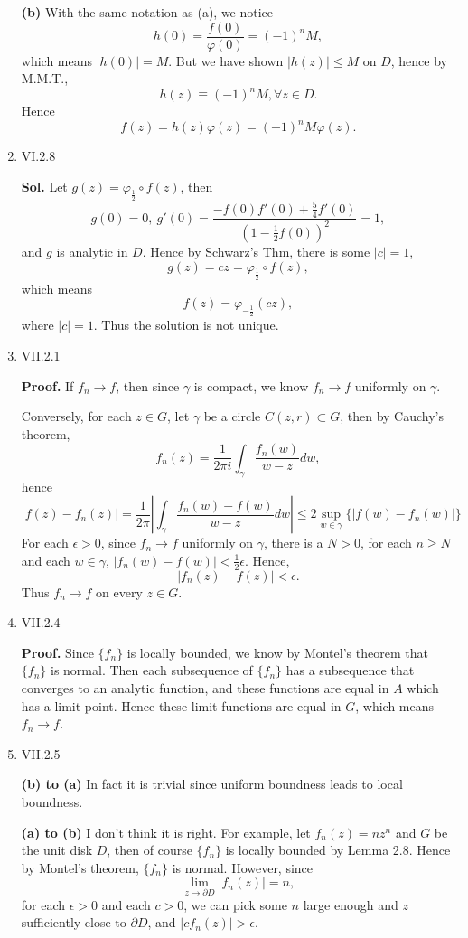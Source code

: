 \documentclass{article}%
\begin{document}
\begin{enumerate}
\textbf{(b)}
With the same notation as (a), we notice
$$
h(0) = \frac{f(0)}{\varphi(0)} = (-1)^{n}M,
$$
which means $|h(0)| = M$. But we have shown $|h(z)| \le M$ on $D$, hence by M.M.T., 
$$
h(z) \equiv (-1)^nM, \forall z\in D.
$$
Hence
$$
f(z) = h(z)\varphi(z) = (-1)^nM\varphi(z).
$$

\item VI.2.8

\textbf{Sol.}
Let $g(z) = \varphi_{\frac{1}{2}}\circ f(z) $, then 
$$
g(0) = 0, ~g'(0) = \frac{-f(0)f'(0)+\frac{5}{4}f'(0)}{(1-\frac{1}{2}f(0))^2} = 1,
$$
and $g$ is analytic in $D$. Hence by Schwarz's Thm, there is some $|c| = 1$,
$$
g(z) = cz = \varphi_{\frac{1}{2}}\circ f(z),
$$ 
which means
$$
f(z) = \varphi_{-\frac{1}{2}}(cz),
$$
where $|c| = 1$. Thus the solution is not unique.


\item VII.2.1

\textbf{Proof.} 
If $f_n\to f $, then since $\gamma$ is compact, we know $f_n\to f $ uniformly on $\gamma$.

Conversely, for each $z\in G$, let $\gamma$ be a circle $C(z, r)\subset G$, then by Cauchy's theorem,
$$
f_n(z) = \frac{1}{2\pi i}\int_{\gamma}\frac{f_n(w)}{w-z}dw,
$$
hence
$$
|f(z)-f_n(z)| = \frac{1}{2\pi}\left|\int_{\gamma}\frac{f_n(w)-f(w)}{w-z}dw\right| \le 2\sup_{w\in\gamma}\{|f(w)-f_n(w)|\}
$$
For each $\epsilon > 0$, since $f_n\to f $ uniformly on $\gamma$, there is a $N > 0$, for each $n \ge N$ and each $w\in\gamma$, $|f_n(w) - f(w)| < \frac{1}{2}\epsilon$. Hence, 
$$
|f_n(z) - f(z)| < \epsilon.
$$
Thus $f_n \to f$ on every $z\in G$.

\item VII.2.4

\textbf{Proof.}
Since $\{f_n\}$ is locally bounded, we know by Montel's theorem that $\{f_n\}$ is normal. Then each subsequence of $\{f_n\}$ has a subsequence that converges to an analytic function, and these functions are equal in $A$ which has a limit point. Hence these limit functions are equal in $G$, which means $f_n\to f $.


\item VII.2.5

\textbf{(b) to (a)} In fact it is trivial since uniform boundness leads to local boundness.

\textbf{(a) to (b)} I don't think it is right. For example, let $f_n(z) = nz^n $ and $G$ be the unit disk $D$, then of course $\{f_n\}$ is locally bounded by Lemma 2.8. Hence by Montel's theorem, $\{f_n\}$ is normal. However, since 
$$
\lim_{z\to \partial D} |f_n(z)| = n,
$$
for each $\epsilon > 0$ and each $c > 0$, we can pick some $n$ large enough and $z$ sufficiently close to $\partial D$, and $|cf_n(z)| > \epsilon$.




\end{enumerate}
\end{document}
